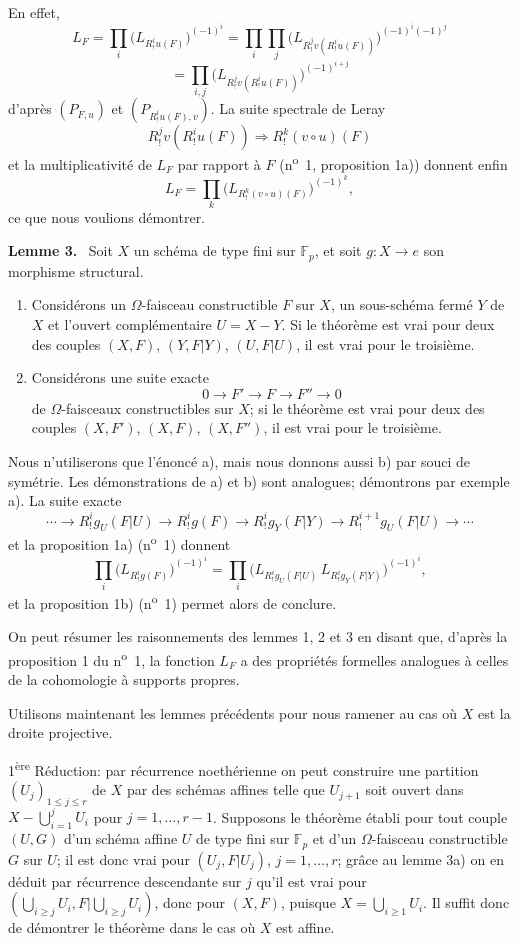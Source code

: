 \documentclass[11pt]{article}
\newenvironment{statement}[1]{\par\medskip\noindent\textbf{#1.}\ }{\par\medskip}
\begin{document}
En effet,
\[
L_F=\prod_i\bigl(L_{R^i_!u(F)}\bigr)^{(-1)^i}
 =\prod_i\prod_j\bigl(L_{R^j_!v(R^i_!u(F))}\bigr)^{(-1)^i(-1)^j}
\]
\[
=\prod_{i,j}\bigl(L_{R^j_!v(R^i_!u(F))}\bigr)^{(-1)^{i+j}}
\]
d'après $(P_{F,u})$ et $(P_{R^i_!u(F),v})$. La suite spectrale de Leray
\[
R^j_!v(R^i_!u(F))\Longrightarrow R^k_!(v\circ u)(F)
\]
et la multiplicativité de $L_F$ par rapport à $F$ (n\textsuperscript{o}~1, proposition 1a)) donnent enfin
\[
L_F=\prod_k\bigl(L_{R^k_!(v\circ u)(F)}\bigr)^{(-1)^k},
\]
ce que nous voulions démontrer.

\begin{statement}{Lemme 3}
Soit $X$ un schéma de type fini sur $\mathbb F_p$, et soit $g:X\to e$ son morphisme structural.
\begin{enumerate}[label=\alph*)]
\item Considérons un $\Omega$-faisceau constructible $F$ sur $X$, un sous-schéma fermé $Y$ de $X$ et l'ouvert complémentaire $U=X-Y$. Si le théorème est vrai pour deux des couples $(X,F)$, $(Y,F|Y)$, $(U,F|U)$, il est vrai pour le troisième.
\item Considérons une suite exacte
\[
0\longrightarrow F'\longrightarrow F\longrightarrow F''\longrightarrow0
\]
de $\Omega$-faisceaux constructibles sur $X$; si le théorème est vrai pour deux des couples $(X,F')$, $(X,F)$, $(X,F'')$, il est vrai pour le troisième.
\end{enumerate}
\end{statement}

Nous n'utiliserons que l'énoncé a), mais nous donnons aussi b) par souci de symétrie. Les démonstrations de a) et b) sont analogues; démontrons par exemple a). La suite exacte
\[
\cdots\longrightarrow R^i_!g_U(F|U)\longrightarrow R^i_!g(F)
\longrightarrow R^i_!g_Y(F|Y)\longrightarrow R^{i+1}_!g_U(F|U)\longrightarrow\cdots
\]
et la proposition 1a) (n\textsuperscript{o}~1) donnent
\[
\prod_i\bigl(L_{R^i_!g(F)}\bigr)^{(-1)^i}
=\prod_i\bigl(L_{R^i_!g_U(F|U)}\,L_{R^i_!g_Y(F|Y)}\bigr)^{(-1)^i},
\]
et la proposition 1b) (n\textsuperscript{o}~1) permet alors de conclure.

On peut résumer les raisonnements des lemmes 1, 2 et 3 en disant que, d'après la proposition 1 du n\textsuperscript{o}~1, la fonction $L_F$ a des propriétés formelles analogues à celles de la cohomologie à supports propres.

Utilisons maintenant les lemmes précédents pour nous ramener au cas où $X$ est la droite projective.

1\textsuperscript{ère} Réduction: par récurrence noethérienne on peut construire une partition $(U_j)_{1\le j\le r}$ de $X$ par des schémas affines telle que $U_{j+1}$ soit ouvert dans $X-\bigcup_{i=1}^jU_i$ pour $j=1,\ldots,r-1$. Supposons le théorème établi pour tout couple $(U,G)$ d'un schéma affine $U$ de type fini sur $\mathbb F_p$ et d'un $\Omega$-faisceau constructible $G$ sur $U$; il est donc vrai pour $(U_j,F|U_j)$, $j=1,\ldots,r$; grâce au lemme 3a) on en déduit par récurrence descendante sur $j$ qu'il est vrai pour $(\bigcup_{i\ge j}U_i,F|\bigcup_{i\ge j}U_i)$, donc pour $(X,F)$, puisque $X=\bigcup_{i\ge1}U_i$. Il suffit donc de démontrer le théorème dans le cas où $X$ est affine.
\end{document}
